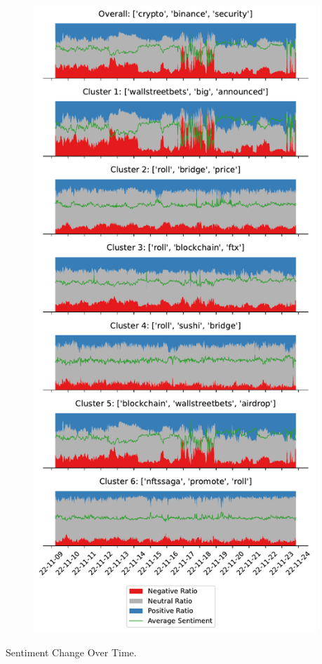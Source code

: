\documentclass[final]{beamer}
\begin{document}
\begin{frame}[t]
\begin{columns}[t]
		\begin{column}{0.24\paperwidth}
			\centering
			\begin{figure}
				\centering
				\includegraphics[width=\textwidth]{./figures/Results/sentiment/change_over_time.pdf}
			\end{figure}
			\vspace{-0.6em}
			{\color{rpi_darkgray} \small Sentiment Change Over Time.}
		\end{column}
		\begin{column}{0.01\paperwidth}\end{column}
	\end{columns}


\end{frame}
\end{document}
